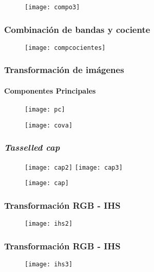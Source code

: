 \documentclass[14pt]{beamer}
\begin{document}
\begin{frame}
  \begin{figure}
    \centering
    \texttt{[image: compo3]}
  \end{figure}
\tiny{}
\end{frame}
\begin{frame}
\frametitle{Combinación de bandas y cociente}
  \begin{figure}
    \centering
    \texttt{[image: compcocientes]}
  \end{figure}
\end{frame}
\begin{frame}
\frametitle{Transformación de imágenes}
\framesubtitle{Componentes Principales}
  \begin{figure}
    \centering
    \texttt{[image: pc]}
  \end{figure}
\tiny{}
\end{frame}
\begin{frame}
  \begin{figure}
    \centering
    \texttt{[image: cova]}
  \end{figure}
\tiny{}
\end{frame}
\begin{frame}
\frametitle{\emph{Tasselled cap}}
  \begin{figure}
    \centering
    \texttt{[image: cap2]}
     \texttt{[image: cap3]}
  \end{figure}
\tiny{}
\end{frame}
\begin{frame}
  \begin{figure}
    \centering
    \texttt{[image: cap]}
  \end{figure}
\tiny{}
\end{frame}
\begin{frame}
\frametitle{Transformación RGB - IHS}
  \begin{figure}
    \centering
    \texttt{[image: ihs2]}
  \end{figure}
\tiny{}
\end{frame}
\begin{frame}
\frametitle{Transformación RGB - IHS}
  \begin{figure}
    \centering
    \texttt{[image: ihs3]}
  \end{figure}
\tiny{}
\end{frame}
\end{document}
